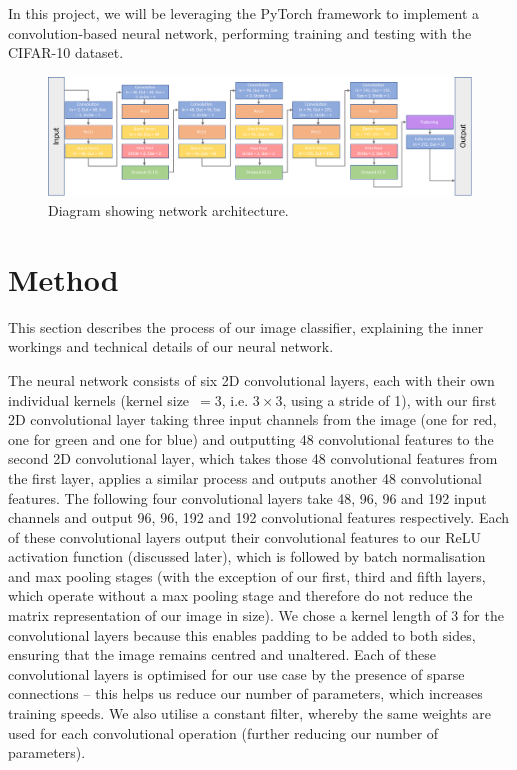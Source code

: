 \documentclass[journal,twoside]{IEEEtran}
\begin{document}
In this project, we will be leveraging the PyTorch framework to implement a convolution-based neural network, performing training and testing with the CIFAR-10 dataset.

\begin{figure}[t!]
\centering
\includegraphics[width=\textwidth]{diagram.pdf}
\caption{Diagram showing network architecture.}
\end{figure}

\section{Method}
This section describes the process of our image classifier, explaining the inner workings and technical details of our neural network.

The neural network consists of six 2D convolutional layers, each with their own individual kernels (kernel size~$=3$, i.e. $3\times{}3$, using a stride of 1), with our first 2D convolutional layer taking three input channels from the image (one for red, one for green and one for blue) and outputting 48 convolutional features to the second 2D convolutional layer, which takes those 48 convolutional features from the first layer, applies a similar process and outputs another 48 convolutional features. The following four convolutional layers take 48, 96, 96 and 192 input channels and output 96, 96, 192 and 192 convolutional features respectively. Each of these convolutional layers output their convolutional features to our ReLU activation function (discussed later), which is followed by batch normalisation and max pooling stages (with the exception of our first, third and fifth layers, which operate without a max pooling stage and therefore do not reduce the matrix representation of our image in size). We chose a kernel length of 3 for the convolutional layers because this enables padding to be added to both sides, ensuring that the image remains centred and unaltered. Each of these convolutional layers is optimised for our use case by the presence of sparse connections -- this helps us reduce our number of parameters, which increases training speeds. We also utilise a constant filter, whereby the same weights are used for each convolutional operation (further reducing our number of parameters).
\end{document}
